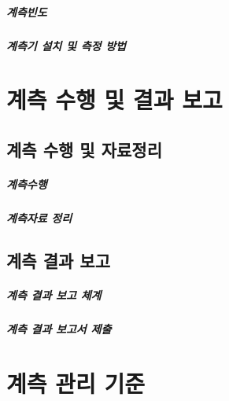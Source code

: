 \documentclass[12pt, a4paper, oneside]{book}
\let\stdsection\section
\renewcommand\section{\newpage\stdsection}
\begin{document}
		\paragraph{계측빈도}
		
		\paragraph{계측기 설치 및 측정 방법}
		



	\chapter{계측 수행 및 결과 보고}
	\minitoc				%

	\section{계측 수행 및 자료정리}
	
		\paragraph{계측수행}
	
		\paragraph{계측자료 정리}

	\section{계측 결과 보고}
	
		\paragraph{계측 결과 보고 체계}
		
		\paragraph{계측 결과 보고서 제출}
		
		
	\chapter{계측 관리 기준}
	\minitoc				%
		
\end{document}
